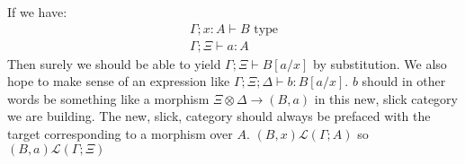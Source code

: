 \begin{itemize}
If we have:
\[
\begin{split}
\Gamma; x : A \vdash B \text{ type}\\
\Gamma; \Xi \vdash a : A
\end{split}
\]
Then surely we should be able to yield $\Gamma; \Xi \vdash B[a/x]$ by substitution.
We also hope to make sense of an expression like $\Gamma; \Xi; \Delta \vdash b : B[a/x]$.
$b$ should in other words be something like a morphism $\Xi \otimes \Delta \to (B, a)$ in this new, slick category we are building.
The new, slick, category should always be prefaced with the target corresponding to a morphism over $A$.
$(B, x) \mathcal{L}(\Gamma; A)$ so $(B, a) \mathcal{L}(\Gamma; \Xi)$
\end{itemize}
